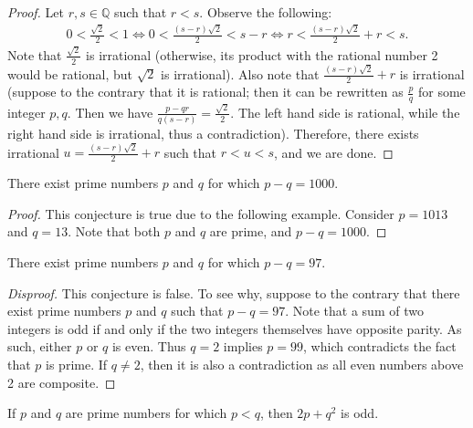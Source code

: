 \documentclass{exam}
\begin{document}
\begin{proof}
    Let $r, s\in\mathbb Q$ such that $r < s$. Observe the following:
    \begin{align*}
        0 <\frac{\sqrt2}2<1\iff0 < \frac{(s-r)\sqrt2}2< s-r\iff r < \frac{(s-r)\sqrt2}2+r < s.
    \end{align*}
    Note that $\frac{\sqrt2}2$ is irrational (otherwise, its product with the rational number 2 would be rational, but $\sqrt2$ is irrational). Also note that $\frac{(s-r)\sqrt2}2 + r$ is irrational (suppose to the contrary that it is rational; then it can be rewritten as $\frac p q$ for some integer $p, q$. Then we have $\frac{p-qr}{q(s-r)}=\frac{\sqrt2}2$. The left hand side is rational, while the right hand side is irrational, thus a contradiction). Therefore, there exists irrational $u =\frac{(s-r)\sqrt2}2 + r$ such that $r < u < s$, and we are done.
\end{proof}

\begin{conjecture}{9.20}
    There exist prime numbers $p$ and $q$ for which $p-q=1000$.
\end{conjecture}

\begin{proof}
    This conjecture is true due to the following example. Consider $p = 1013$ and $q = 13$. Note that both $p$ and $q$ are prime, and $p-q = 1000$.
\end{proof}

\begin{conjecture}{9.21}
    There exist prime numbers $p$ and $q$ for which $p-q=97$.
\end{conjecture}

\begin{proof}[Disproof]
    This conjecture is false. To see why, suppose to the contrary that there exist prime numbers $p$ and $q$ such that $p-q =97$. Note that a sum of two integers is odd if and only if the two integers themselves have opposite parity. As such, either $p$ or $q$ is even. Thus $q = 2$ implies $p = 99$, which contradicts the fact that $p$ is prime. If $q\neq2$, then it is also a contradiction as all even numbers above 2 are composite.
\end{proof}

\begin{conjecture}{9.22}
    If $p$ and $q$ are prime numbers for which $p < q$, then $2p+q^2$ is odd.
\end{conjecture}
\end{document}
